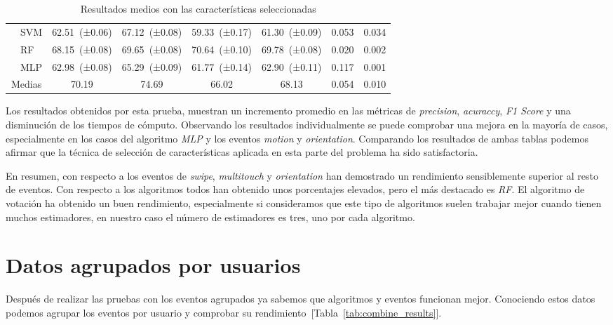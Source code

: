 \begin{table}[!h]
\begin{tabular}{l l c c c c c c}
& SVM  & 62.51\ {\footnotesize  (±0.06)}  & 67.12\ {\footnotesize  (±0.08)} & 59.33\ {\footnotesize  (±0.17)}  & 61.30\ {\footnotesize  (±0.09)} &  0.053 & 0.034 \\
& RF  & 68.15\ {\footnotesize  (±0.08)}  & 69.65\ {\footnotesize  (±0.08)} & 70.64\ {\footnotesize  (±0.10)}  & 69.78\ {\footnotesize  (±0.08)} &  0.020 & 0.002 \\
& MLP  & 62.98\ {\footnotesize  (±0.08)}  & 65.29\ {\footnotesize  (±0.09)} & 61.77\ {\footnotesize  (±0.14)}  & 62.90\ {\footnotesize  (±0.11)} &  0.117 & 0.001 \\
\bottomrule
\multicolumn{2}{c}{Medias} & 70.19 &	74.69	&66.02	&68.13	&0.054	&0.010 \\
\bottomrule
\end{tabular}

    \caption{Resultados medios con las características seleccionadas}
    \label{tab:final_results}
\end{table}

Los resultados obtenidos por esta prueba, muestran un incremento promedio en las métricas de \textit{precision}, \textit{acuraccy}, \textit{F1 Score} y una disminución de los tiempos de cómputo. Observando los resultados individualmente se puede comprobar una mejora en la mayoría de casos, especialmente en los casos del algoritmo \textit{MLP} y los eventos \textit{motion} y \textit{orientation}. Comparando los resultados de ambas tablas podemos afirmar que la técnica de selección de características aplicada en esta parte del problema ha sido satisfactoria.

En resumen, con respecto a los eventos de \textit{swipe}, \textit{multitouch} y \textit{orientation} han demostrado un rendimiento sensiblemente superior al resto de eventos. Con respecto a los algoritmos todos han obtenido unos porcentajes elevados, pero el más destacado es \textit{RF}. El algoritmo de votación ha obtenido un buen rendimiento, especialmente si consideramos que este tipo de algoritmos suelen trabajar mejor cuando tienen muchos estimadores, en nuestro caso el número de estimadores es tres, uno por cada algoritmo.

\newpage

\section{Datos agrupados por usuarios}

Después de realizar las pruebas con los eventos agrupados ya sabemos que algoritmos y eventos funcionan mejor. Conociendo estos datos podemos agrupar los eventos por usuario y comprobar su rendimiento~[Tabla~\ref{tab:combine_results}].

